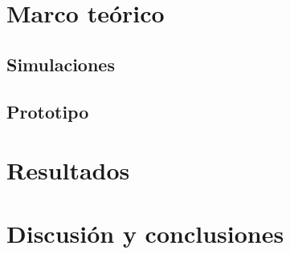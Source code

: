 \documentclass[a4paper,11pt]{article}
\begin{document}
\pagestyle{plain}

\thispagestyle{empty}


\newpage
\thispagestyle{empty}
\mbox{}

\newpage


\newpage
\thispagestyle{empty}
\tableofcontents

\newpage
\thispagestyle{empty}
\listoffigures

\newpage
\thispagestyle{empty}
\listoftables


\newpage


\newpage


\newpage
\section{Marco teórico}

\newpage



\newpage
\subsection{Simulaciones}

\newpage
\subsection{Prototipo}

\newpage
\section{Resultados}

\newpage
\section{Discusión y conclusiones}
\end{document}
